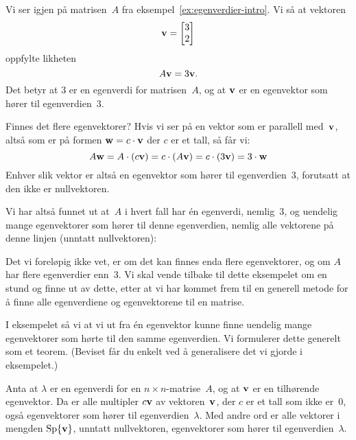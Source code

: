 \begin{ex}
Vi ser igjen på matrisen~$A$ fra eksempel~\ref{ex:egenverdier-intro}.
Vi så at vektoren
\[
\mathbf{v} = \begin{bmatrix} 3 \\ 2 \end{bmatrix}
\]
oppfylte likheten
\[
A \mathbf{v} = 3 \mathbf{v}.
\]
Det betyr at $3$ er en egenverdi for matrisen~$A$, og at $\mathbf{v}$ er en
egenvektor som hører til egenverdien~$3$.

Finnes det flere egenvektorer?  Hvis vi ser på en vektor som er
parallell med~$\mathbf{v}$, altså som er på formen $\mathbf{w} = c \cdot \mathbf{v}$
der $c$ er et tall, så får vi:
\[
A \mathbf{w}
= A \cdot (c \mathbf{v})
= c \cdot (A \mathbf{v})
= c \cdot (3 \mathbf{v})
= 3 \cdot \mathbf{w}
\]
Enhver slik vektor er altså en egenvektor som hører til
egenverdien~$3$, forutsatt at den ikke er nullvektoren.

Vi har altså funnet ut at~$A$ i hvert fall har én egenverdi,
nemlig~$3$, og uendelig mange egenvektorer som hører til denne
egenverdien, nemlig alle vektorene på denne linjen (unntatt
nullvektoren):
\begin{center}
\end{center}

Det vi foreløpig ikke vet, er om det kan finnes enda flere
egenvektorer, og om $A$ har flere egenverdier enn~$3$.  Vi skal vende
tilbake til dette eksempelet om en stund og finne ut av dette, etter
at vi har kommet frem til en generell metode for å finne alle
egenverdiene og egenvektorene til en matrise.
\end{ex}

I eksempelet så vi at vi ut fra én egenvektor kunne finne uendelig
mange egenvektorer som hørte til den samme egenverdien.  Vi formulerer
dette generelt som et teorem.  (Beviset får du enkelt ved å
generalisere det vi gjorde i eksempelet.)

\begin{thm}
\label{thm:egenvektor-sp}
Anta at $\lambda$ er en egenverdi for en $n \times n$-matrise~$A$, og
at $\mathbf{v}$ er en tilhørende egenvektor.  Da er alle multipler
$c \mathbf{v}$ av vektoren~$\mathbf{v}$, der $c$ er et tall som ikke er~$0$,
også egenvektorer som hører til egenverdien~$\lambda$.  Med andre ord
er alle vektorer i mengden $\operatorname{Sp} \{\mathbf{v}\}$, unntatt nullvektoren,
egenvektorer som hører til egenverdien~$\lambda$.
\end{thm}

